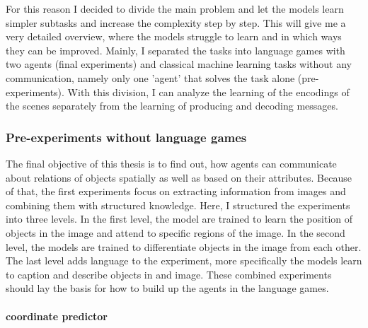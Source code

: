 For this reason I decided to divide the main problem and let the models learn simpler subtasks and increase the complexity step by step.
This will give me a very detailed overview, where the models struggle to learn and in which ways they can be improved.
Mainly, I separated the tasks into language games with two agents (final experiments) and classical machine learning tasks without any communication, namely only one 'agent' that solves the task alone (pre-experiments).
With this division, I can analyze the learning of the encodings of the scenes separately from the learning of producing and decoding messages.

\subsubsection{Pre-experiments without language games}
The final objective of this thesis is to find out, how agents can communicate about relations of objects spatially as well as based on their attributes.
Because of that, the first experiments focus on extracting information from images and combining them with structured knowledge.
Here, I structured the experiments into three levels.
In the first level, the model are trained to learn the position of objects in the image and attend to specific regions of the image.
In the second level, the models are trained to differentiate objects in the image from each other.
The last level adds language to the experiment, more specifically the models learn to caption and describe objects in and image.
These combined experiments should lay the basis for how to build up the agents in the language games.

\paragraph{coordinate predictor}


